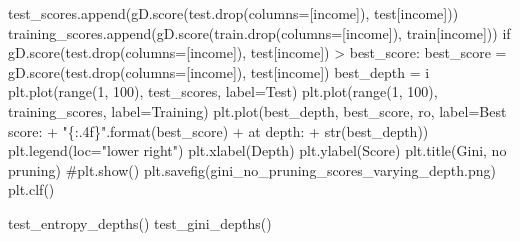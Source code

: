 \documentclass[
  letterpaper,
  DIV=11,
  numbers=noendperiod]{scrartcl}
\newenvironment{Shaded}{\begin{snugshade}}{\end{snugshade}}
\newcommand{\BuiltInTok}[1]{\textcolor[rgb]{0.00,0.23,0.31}{#1}}
\newcommand{\CommentTok}[1]{\textcolor[rgb]{0.37,0.37,0.37}{#1}}
\newcommand{\ControlFlowTok}[1]{\textcolor[rgb]{0.00,0.23,0.31}{#1}}
\newcommand{\DecValTok}[1]{\textcolor[rgb]{0.68,0.00,0.00}{#1}}
\newcommand{\NormalTok}[1]{\textcolor[rgb]{0.00,0.23,0.31}{#1}}
\newcommand{\OperatorTok}[1]{\textcolor[rgb]{0.37,0.37,0.37}{#1}}
\newcommand{\SpecialCharTok}[1]{\textcolor[rgb]{0.37,0.37,0.37}{#1}}
\newcommand{\StringTok}[1]{\textcolor[rgb]{0.13,0.47,0.30}{#1}}
\begin{document}
\begin{Shaded}
\begin{Highlighting}[]
\NormalTok{        test\_scores.append(gD.score(test.drop(columns}\OperatorTok{=}\NormalTok{[}\StringTok{\textquotesingle{}income\textquotesingle{}}\NormalTok{]), test[}\StringTok{\textquotesingle{}income\textquotesingle{}}\NormalTok{]))}
\NormalTok{        training\_scores.append(gD.score(train.drop(columns}\OperatorTok{=}\NormalTok{[}\StringTok{\textquotesingle{}income\textquotesingle{}}\NormalTok{]), train[}\StringTok{\textquotesingle{}income\textquotesingle{}}\NormalTok{]))}
        \ControlFlowTok{if}\NormalTok{ gD.score(test.drop(columns}\OperatorTok{=}\NormalTok{[}\StringTok{\textquotesingle{}income\textquotesingle{}}\NormalTok{]), test[}\StringTok{\textquotesingle{}income\textquotesingle{}}\NormalTok{]) }\OperatorTok{\textgreater{}}\NormalTok{ best\_score:}
\NormalTok{            best\_score }\OperatorTok{=}\NormalTok{ gD.score(test.drop(columns}\OperatorTok{=}\NormalTok{[}\StringTok{\textquotesingle{}income\textquotesingle{}}\NormalTok{]), test[}\StringTok{\textquotesingle{}income\textquotesingle{}}\NormalTok{])}
\NormalTok{            best\_depth }\OperatorTok{=}\NormalTok{ i}
\NormalTok{    plt.plot(}\BuiltInTok{range}\NormalTok{(}\DecValTok{1}\NormalTok{, }\DecValTok{100}\NormalTok{), test\_scores, label}\OperatorTok{=}\StringTok{\textquotesingle{}Test\textquotesingle{}}\NormalTok{)}
\NormalTok{    plt.plot(}\BuiltInTok{range}\NormalTok{(}\DecValTok{1}\NormalTok{, }\DecValTok{100}\NormalTok{), training\_scores, label}\OperatorTok{=}\StringTok{\textquotesingle{}Training\textquotesingle{}}\NormalTok{)}
\NormalTok{    plt.plot(best\_depth, best\_score, }\StringTok{\textquotesingle{}ro\textquotesingle{}}\NormalTok{, label}\OperatorTok{=}\StringTok{\textquotesingle{}Best score: \textquotesingle{}}
         \OperatorTok{+} \StringTok{"}\SpecialCharTok{\{:.4f\}}\StringTok{"}\NormalTok{.}\BuiltInTok{format}\NormalTok{(best\_score) }\OperatorTok{+} \StringTok{\textquotesingle{} at depth: \textquotesingle{}} \OperatorTok{+} \BuiltInTok{str}\NormalTok{(best\_depth))}
\NormalTok{    plt.legend(loc}\OperatorTok{=}\StringTok{"lower right"}\NormalTok{)}
\NormalTok{    plt.xlabel(}\StringTok{\textquotesingle{}Depth\textquotesingle{}}\NormalTok{)}
\NormalTok{    plt.ylabel(}\StringTok{\textquotesingle{}Score\textquotesingle{}}\NormalTok{)}
\NormalTok{    plt.title(}\StringTok{\textquotesingle{}Gini, no pruning\textquotesingle{}}\NormalTok{)}
    \CommentTok{\#plt.show()}
\NormalTok{    plt.savefig(}\StringTok{\textquotesingle{}gini\_no\_pruning\_scores\_varying\_depth.png\textquotesingle{}}\NormalTok{)}
\NormalTok{    plt.clf()}

\NormalTok{test\_entropy\_depths()}
\NormalTok{test\_gini\_depths()}
\end{Highlighting}
\end{Shaded}
\end{document}
